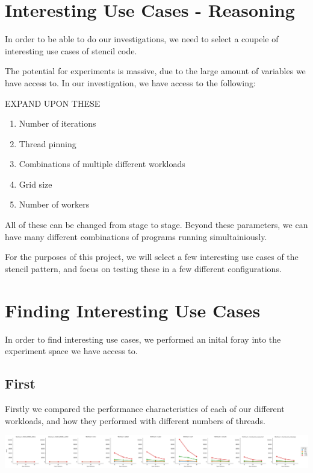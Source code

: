 
\section{Interesting Use Cases - Reasoning}

In order to be able to do our investigations, we need to select a coupele of interesting use cases of stencil code.

The potential for experiments is massive, due to the large amount of variables we have access to. In our investigation, we have access to the following:

EXPAND UPON THESE

\begin{enumerate}
	\item Number of iterations
	\item Thread pinning
	\item Combinations of multiple different workloads
	\item Grid size
	\item Number of workers
\end{enumerate}

All of these can be changed from stage to stage. Beyond these parameters, we can have many different combinations of programs running simultainiously. 

For the purposes of this project, we will select a few interesting use cases of the stencil pattern, and focus on testing these in a few different configurations.



\section{Finding Interesting Use Cases}

In order to find interesting use cases, we performed an inital foray into the experiment space we have access to.

\subsection{First}

Firstly we compared the performance characteristics of each of our different workloads, and how they performed with different numbers of threads.

\includegraphics[width=1\textwidth]{graphics/quicktest.png}

